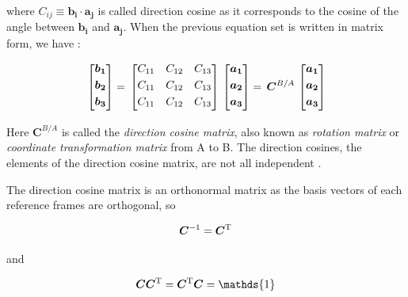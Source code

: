where $C_{ij} \equiv {\bm{b_i} \cdot \bm{a_j}} $  is called direction cosine as it corresponds to the cosine of the angle between  $\bm{b_i}$ and $\bm{a_j}$. 
When the previous equation set is written in matrix form, we have :

\begin{equation}{\label{eqn:C_B_Amatrix}}
\begin{bmatrix}
\bm{b_1}\\[0.3em]
\bm{b_2}\\[0.3em]
\bm{b_3}\\[0.3em]
\end{bmatrix}
=\,
\begin{bmatrix}
C_{11} & C_{12} & C_{13}\\[0.3em]
C_{11} & C_{12} & C_{13}\\[0.3em]
C_{11} & C_{12} & C_{13}\\[0.3em]
\end{bmatrix}
\,
\begin{bmatrix}
\bm{a_1}\\[0.3em]
\bm{a_2}\\[0.3em]
\bm{a_3}\\[0.3em]
\end{bmatrix}
=\,
\bm{C}^{B/A}
\,
\begin{bmatrix}
\bm{a_1}\\[0.3em]
\bm{a_2}\\[0.3em]
\bm{a_3}\\[0.3em]
\end{bmatrix}
\end{equation} 

Here $\bm{C}^{B/A}$ is called the \emph{direction cosine matrix}, also known as \emph{rotation matrix} or \emph{coordinate transformation matrix} from A to B\cite{wie2008space}.  
The direction cosines, the elements of the direction cosine matrix, are not all independent  \cite{wertz1978spacecraftAttitude}.

The direction cosine matrix is an orthonormal matrix as the basis vectors of each reference frames are orthogonal, so

\begin{equation}
\label{eqn:orthonormality}
\bm{C}^{-1} = \bm{C}^{\rm T}
\end{equation}

and

\begin{equation}
\label{eqn:orthonormality2}
\bm{C}\bm{C}^{\rm T} = \bm{C}^{\rm T}\bm{C} = \mathds{1}
\end{equation}

